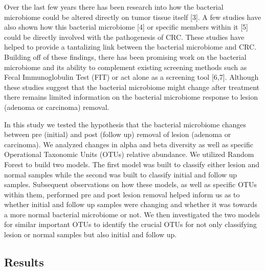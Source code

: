 \documentclass[12pt,]{article}
\begin{document}
Over the last few years there has been research into how the bacterial
microbiome could be altered directly on tumor tissue itself {[}3{]}. A
few studies have also shown how this bacterial microbiome {[}4{]} or
specific members within it {[}5{]} could be directly involved with the
pathogenesis of CRC. These studies have helped to provide a tantalizing
link between the bacterial microbiome and CRC. Building off of these
findings, there has been promising work on the bacterial microbiome and
its ability to complement existing screening methods such as Fecal
Immunoglobulin Test (FIT) or act alone as a screening tool {[}6,7{]}.
Although these studies suggest that the bacterial microbiome might
change after treatment there remains limited information on the
bacterial microbiome response to lesion (adenoma or carcinoma) removal.

In this study we tested the hypothesis that the bacterial microbiome
changes between pre (initial) and post (follow up) removal of lesion
(adenoma or carcinoma). We analyzed changes in alpha and beta diversity
as well as specific Operational Taxonomic Units (OTUs) relative
abundance. We utilized Random Forest to build two models. The first
model was built to classify either lesion and normal samples while the
second was built to classify initial and follow up samples. Subsequent
observations on how these models, as well as specific OTUs within them,
performed pre and post lesion removal helped inform us as to whether
initial and follow up samples were changing and whether it was towards a
more normal bacterial microbiome or not. We then investigated the two
models for similar important OTUs to identify the crucial OTUs for not
only classifying lesion or normal samples but also initial and follow
up.

\newpage

\subsection{Results}\label{results}
\end{document}
